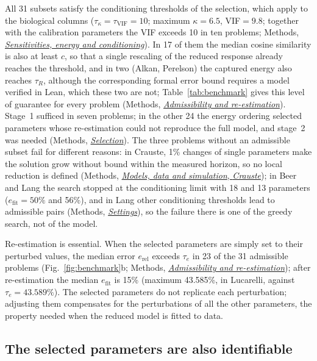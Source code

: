 \documentclass[pdflatex,sn-nature]{sn-jnl}
\theoremstyle{plain}
\newcommand{\mref}[2]{\hyperref[#1]{#2}}
\begin{document}
All 31 subsets satisfy the conditioning thresholds of the selection, which apply to the biological columns ($\tau_\kappa=\tau_{\mathrm{VIF}}=10$; maximum $\kappa=6.5$, VIF$=9.8$; together with the calibration parameters the VIF exceeds 10 in ten problems; Methods, \mref{met:sens}{\emph{Sensitivities, energy and conditioning}}). In 17 of them the median cosine similarity is also at least $c$, so that a single rescaling of the reduced response already reaches the threshold, and in two (Alkan, Perelson) the captured energy also reaches $\tau_R$, although the corresponding formal error bound requires a model verified in Lean, which these two are not; Table~\ref{tab:benchmark} gives this level of guarantee for every problem (Methods, \mref{met:adm}{\emph{Admissibility and re-estimation}}). Stage~1 sufficed in seven problems; in the other 24 the energy ordering selected parameters whose re-estimation could not reproduce the full model, and stage~2 was needed (Methods, \mref{met:selection}{\emph{Selection}}). The three problems without an admissible subset fail for different reasons: in Crauste, 1\% changes of single parameters make the solution grow without bound within the measured horizon, so no local reduction is defined (Methods, \mref{met:crauste}{\emph{Models, data and simulation}, \emph{Crauste}}); in Beer and Lang the search stopped at the conditioning limit with 18 and 13 parameters ($e_{\mathrm{fit}}=50\%$ and 56\%), and in Lang other conditioning thresholds lead to admissible pairs (Methods, \mref{met:settings}{\emph{Settings}}), so the failure there is one of the greedy search, not of the model.

Re-estimation is essential. When the selected parameters are simply set to their perturbed values, the median error $e_{\mathrm{rel}}$ exceeds $\tau_e$ in 23 of the 31 admissible problems (Fig.~\ref{fig:benchmark}b; Methods, \mref{met:adm}{\emph{Admissibility and re-estimation}}); after re-estimation the median $e_{\mathrm{fit}}$ is 15\% (maximum 43.585\%, in Lucarelli, against $\tau_e=43.589\%$). The selected parameters do not replicate each perturbation; adjusting them compensates for the perturbations of all the other parameters, the property needed when the reduced model is fitted to data.



\subsection*{The selected parameters are also identifiable}\label{sec:identif}
\end{document}
